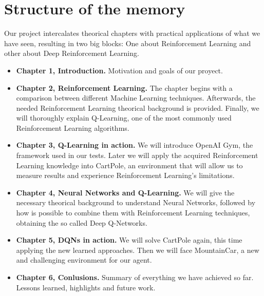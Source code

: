 \section{Structure of the memory}

Our project intercalates theorical chapters with practical applications of what we have seen, resulting in two big blocks: One about Reinforcement Learning and other about Deep Reinforcement Learning.

\begin{itemize}
    \item \textbf{Chapter 1, Introduction.} Motivation and goals of our proyect.
    \item \textbf{Chapter 2, Reinforcement Learning.} The chapter begins with a comparison between different Machine Learning techniques. Afterwards, the needed Reinforcement Learning theorical background is provided. Finally, we will thoroughly explain Q-Learning, one of the most commonly used Reinforcement Learning algorithms.
    \item \textbf{Chapter 3, Q-Learning in action.} We will introduce OpenAI Gym, the framework used in our tests. Later we will apply the acquired Reinforcement Learning knowledge into CartPole, an environment that will allow us to measure results and experience Reinforcement Learning's limitations.
    \item \textbf{Chapter 4, Neural Networks and Q-Learning.} We will give the necessary theorical background to understand Neural Networks, followed by how is possible to combine them with Reinforcement Learning techniques, obtaining the so called Deep Q-Networks.
    \item \textbf{Chapter 5, DQNs in action.} We will solve CartPole again, this time applying the new learned approaches. Then we will face MountainCar, a new and challenging environment for our agent.
    \item \textbf{Chapter 6, Conlusions.} Summary of everything we have achieved so far. Lessons learned, highlights and future work.    
\end{itemize}
